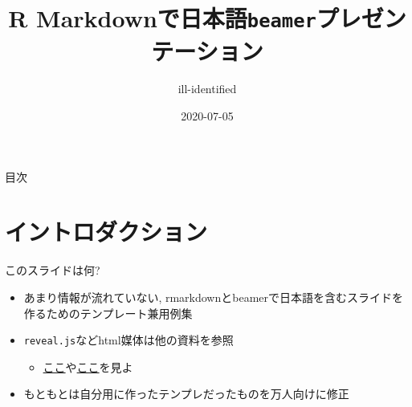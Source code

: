 \documentclass[
  12pt,
  ignorenonframetext,
]{beamer}
\title{R Markdownで日本語\texttt{beamer}プレゼンテーション}
\author{ill-identified}
\date{2020-07-05}
\providecommand{\tightlist}{%
  \setlength{\itemsep}{0pt}\setlength{\parskip}{0pt}}
\begin{document}
\frame{\titlepage}

\begin{frame}
  \tableofcontents[hideallsubsections]
\end{frame}
\begin{frame}{目次}
\protect\hypertarget{ux76eeux6b21}{}

\tableofcontents[hideallsubsections]

\end{frame}

\hypertarget{ux30a4ux30f3ux30c8ux30edux30c0ux30afux30b7ux30e7ux30f3}{%
\section{イントロダクション}\label{ux30a4ux30f3ux30c8ux30edux30c0ux30afux30b7ux30e7ux30f3}}

\begin{frame}[fragile]{このスライドは何?}
\protect\hypertarget{ux3053ux306eux30b9ux30e9ux30a4ux30c9ux306fux4f55}{}

\begin{itemize}
\tightlist
\item
  あまり情報が流れていない,
  rmarkdownとbeamerで日本語を含むスライドを作るためのテンプレート兼用例集
\item
  \texttt{reveal.js}などhtml媒体は他の資料を参照

  \begin{itemize}
  \tightlist
  \item
    \href{https://kazutan.github.io/SappoRoR6/rmd_slide.html\#/}{ここ}や\href{https://kazutan.github.io/fukuokaR11/intro_rmarkdown_d.html}{ここ}を見よ
  \end{itemize}
\item
  もともとは自分用に作ったテンプレだったものを万人向けに修正
\end{itemize}

\end{frame}
\end{document}
